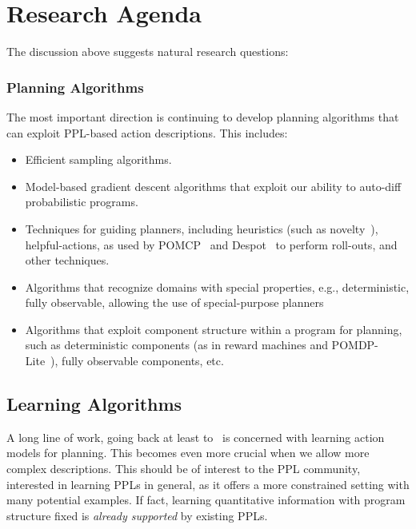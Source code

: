 \documentclass[letterpaper]{article} %
\theoremstyle{definition}
\begin{document}





\section{Research Agenda}
The discussion above suggests natural research questions:
\subsubsection{Planning Algorithms}
The most important direction is continuing to develop planning algorithms that can exploit PPL-based action descriptions. This includes:
\begin{itemize}
    \item Efficient sampling algorithms.
    \item Model-based gradient descent algorithms that exploit our ability to auto-diff probabilistic programs.
    \item Techniques for guiding planners, including heuristics (such as novelty~\cite{Novelty}), helpful-actions,
    as used by  POMCP~\cite{SV10} and Despot~\cite{Despot} to perform roll-outs, and other techniques.
     \item Algorithms that recognize domains with special properties, e.g., deterministic, fully observable, allowing the use of special-purpose planners
    \item Algorithms that exploit component structure
    within a program for planning, such as
    deterministic components (as in reward machines and POMDP-Lite~\cite{POMDP-lite}), fully observable components, etc.
\end{itemize}
\subsection{Learning Algorithms}
A long line of work, going back at least to~\cite{YANG2007107} is concerned with  learning action models for planning. This becomes even more crucial when we allow more complex descriptions. This should be of interest to the PPL community, interested in learning PPLs in general, as it offers a more constrained setting with many potential examples. If fact, learning quantitative information with program structure fixed is {\em already supported} by existing
PPLs.
\end{document}

